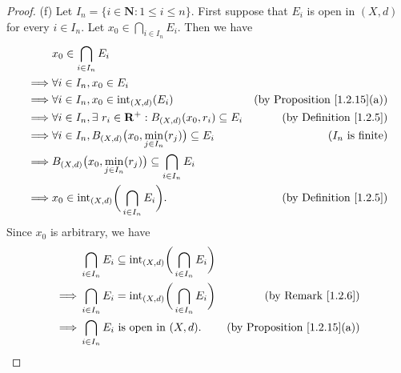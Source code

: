 \begin{proof}{(f)}
    Let \(I_n = \{i \in \mathbf{N} : 1 \leq i \leq n\}\).
    First suppose that \(E_i\) is open in \((X, d)\) for every \(i \in I_n\).
    Let \(x_0 \in \bigcap_{i \in I_n} E_i\).
    Then we have
    \begin{align*}
                 & x_0 \in \bigcap_{i \in I_n} E_i                                                                                                 \\
        \implies & \forall i \in I_n, x_0 \in E_i                                                                                                  \\
        \implies & \forall i \in I_n, x_0 \in \text{int}_{(X, d)}(E_i)                                   & \text{(by Proposition \ref{1.2.15}(a))} \\
        \implies & \forall i \in I_n, \exists\ r_i \in \mathbf{R}^+ : B_{(X, d)}(x_0, r_i) \subseteq E_i & \text{(by Definition \ref{1.2.5})}      \\
        \implies & \forall i \in I_n, B_{(X, d)}\big(x_0, \min_{j \in I_n}(r_j)\big) \subseteq E_i       & \text{(\(I_n\) is finite)}              \\
        \implies & B_{(X, d)}\big(x_0, \min_{j \in I_n}(r_j)\big) \subseteq \bigcap_{i \in I_n} E_i                                                \\
        \implies & x_0 \in \text{int}_{(X, d)}\bigg(\bigcap_{i \in I_n} E_i\bigg).                       & \text{(by Definition \ref{1.2.5})}
    \end{align*}
    Since \(x_0\) is arbitrary, we have
    \begin{align*}
                 & \bigcap_{i \in I_n} E_i \subseteq \text{int}_{(X, d)}\bigg(\bigcap_{i \in I_n} E_i\bigg)                                           \\
        \implies & \bigcap_{i \in I_n} E_i = \text{int}_{(X, d)}\bigg(\bigcap_{i \in I_n} E_i\bigg)         & \text{(by Remark \ref{1.2.6})}          \\
        \implies & \bigcap_{i \in I_n} E_i \text{ is open in } (X, d).                                      & \text{(by Proposition \ref{1.2.15}(a))}
    \end{align*}


\end{proof}
